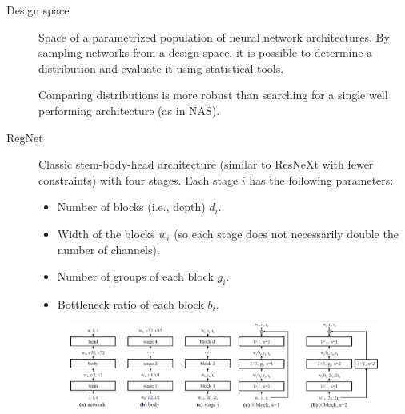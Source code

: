 \begin{description}
    \item[Design space] 
        Space of a parametrized population of neural network architectures. By sampling networks from a design space, it is possible to determine a distribution and evaluate it using statistical tools.

        \begin{remark}
            Comparing distributions is more robust than searching for a single well performing architecture (as in NAS).
        \end{remark}
    
    \item[RegNet] 
        Classic stem-body-head architecture (similar to ResNeXt with fewer constraints) with four stages. Each stage $i$ has the following parameters:
        \begin{itemize}
            \item Number of blocks (i.e., depth) $d_i$.
            \item Width of the blocks $w_i$ (so each stage does not necessarily double the number of channels).
            \item Number of groups of each block $g_i$.
            \item Bottleneck ratio of each block $b_i$.
        \end{itemize}

        \begin{figure}[H]
            \centering
            \includegraphics[width=0.95\linewidth]{./img/regnet.png}
        \end{figure}


\end{description}
